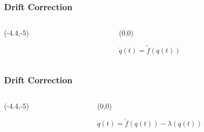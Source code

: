 \begin{frame}
	\frametitle{Drift Correction}
		\begin{columns}[T] %
			\begin{column}{.55\textwidth}
			\centering
				\begin{textblock}{0}(-4.4,-5)
					
				\end{textblock}
			\end{column}
			\hfill
			\begin{column}{0.45\textwidth}
				\begin{textblock}{.9\columnwidth}(0,0)
					\begin{block}{}
					\centering
						\( \dot{q}(t) = \tilde{f}(q(t)) \)
					\end{block}
				\end{textblock}
				\end{column}
		\end{columns}
\end{frame}

\begin{frame}
	\frametitle{Drift Correction}
		\begin{columns}[T] %
			\begin{column}{.55\textwidth}
				\begin{textblock}{0}(-4.4,-5)
					
				\end{textblock}
			\end{column}
			\hfill
			\begin{column}{0.45\textwidth}
				\begin{textblock}{.9\columnwidth}(0,0)
					\begin{block}{}
					\centering
					\( \dot{q}(t) = \tilde{f}(q(t))-\lambda(q(t)) \)
					\end{block}
				\end{textblock}
				\end{column}
		\end{columns}
\end{frame}
